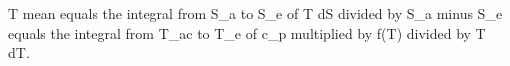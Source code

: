 T mean equals the integral from S_a to S_e of T dS divided by S_a minus S_e equals the integral from T_ac to T_e of c_p multiplied by f(T) divided by T dT.